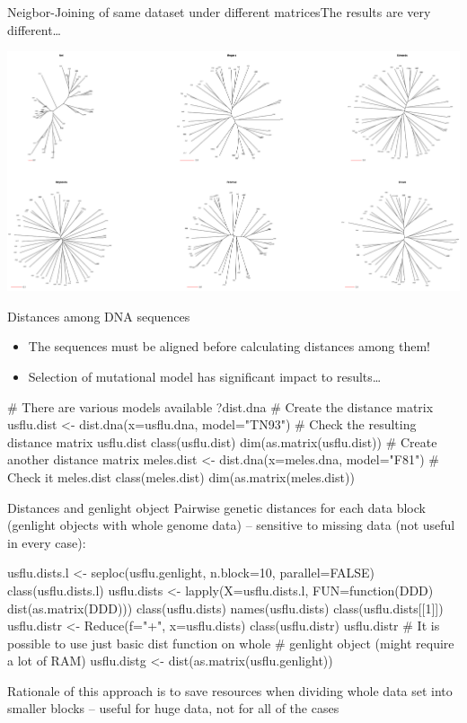 \documentclass[compress, ucs, xelatex, 11pt, xcolor=svgnames,
  hyperref={
    bookmarks=true,
    unicode=true,
    colorlinks=true,
    pdftitle={Molecular data in R},
    plainpages=false,
    pdfauthor={Vojtech Zeisek},
    pdfsubject={Course about phylogeny and evolution in R},
    pdfcreator={XeLaTeX},
    pdfkeywords={R, evolution, phylogeny, molecular data},
    linkcolor=Tomato,
    anchorcolor=SaddleBrown,
    citecolor=Goldenrod,
    filecolor=DarkMagenta,
    menucolor=Sienna,
    urlcolor=DarkTurquoise,
    pdftex},
  url={hyphens, lowtilde} %
  ]{beamer}
\begin{document}
\begin{frame}{Neigbor-Joining of same dataset under different matrices}{The results are very different\ldots}
  \begin{center}
    \includegraphics[width=\textwidth]{distances.png}
  \end{center}
\end{frame}

\begin{frame}[fragile]{Distances among DNA sequences}
  \begin{itemize}
    \item \alert{The sequences must be aligned before calculating distances among them!}
    \item Selection of mutational model has significant impact to results\ldots
  \end{itemize}
  \vfill
  \begin{spluscode}
    # There are various models available
    ?dist.dna
    # Create the distance matrix
    usflu.dist <- dist.dna(x=usflu.dna, model="TN93")
    # Check the resulting distance matrix
    usflu.dist
    class(usflu.dist)
    dim(as.matrix(usflu.dist))
    # Create another distance matrix
    meles.dist <- dist.dna(x=meles.dna, model="F81")
    # Check it
    meles.dist
    class(meles.dist)
    dim(as.matrix(meles.dist))
  \end{spluscode}
\end{frame}

\begin{frame}[fragile]{Distances and genlight object}
  \vfill
  Pairwise genetic distances for each data block (genlight objects with whole genome data) -- sensitive to missing data (not useful in every case):
  \vfill
  \begin{spluscode}
    usflu.dists.l <- seploc(usflu.genlight, n.block=10, parallel=FALSE)
    class(usflu.dists.l)
    usflu.dists <- lapply(X=usflu.dists.l, FUN=function(DDD)
      dist(as.matrix(DDD)))
    class(usflu.dists)
    names(usflu.dists)
    class(usflu.dists[[1]])
    usflu.distr <- Reduce(f="+", x=usflu.dists)
    class(usflu.distr)
    usflu.distr
    # It is possible to use just basic dist function on whole
    # genlight object (might require a lot of RAM)
    usflu.distg <- dist(as.matrix(usflu.genlight))
  \end{spluscode}
  \vfil
  Rationale of this approach is to save resources when dividing whole data set into smaller blocks -- useful for huge data, not for all of the cases
  \vfill
\end{frame}
\end{document}

